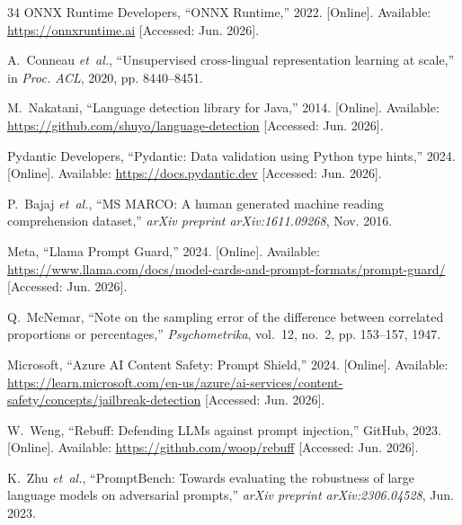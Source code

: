 ﻿\documentclass[conference]{IEEEtran}
\begin{document}
\begin{thebibliography}{34}
ONNX Runtime Developers, ``ONNX Runtime,'' 2022.
[Online]. Available: \url{https://onnxruntime.ai} [Accessed: Jun. 2026].

A.~Conneau \emph{et~al.}, ``Unsupervised cross-lingual representation
learning at scale,'' in \emph{Proc. ACL}, 2020, pp. 8440--8451.

M.~Nakatani, ``Language detection library for Java,'' 2014.
[Online]. Available: \url{https://github.com/shuyo/language-detection}
[Accessed: Jun. 2026].

Pydantic Developers, ``Pydantic: Data validation using Python type hints,''
2024.
[Online]. Available: \url{https://docs.pydantic.dev} [Accessed: Jun. 2026].

P.~Bajaj \emph{et~al.}, ``MS MARCO: A human generated machine reading
comprehension dataset,'' \emph{arXiv preprint arXiv:1611.09268}, Nov. 2016.

Meta, ``Llama Prompt Guard,'' 2024.
[Online]. Available:
\url{https://www.llama.com/docs/model-cards-and-prompt-formats/prompt-guard/}
[Accessed: Jun. 2026].

Q.~McNemar, ``Note on the sampling error of the difference between
correlated proportions or percentages,'' \emph{Psychometrika}, vol.~12,
no.~2, pp. 153--157, 1947.

Microsoft, ``Azure AI Content Safety: Prompt Shield,'' 2024.
[Online]. Available:
\url{https://learn.microsoft.com/en-us/azure/ai-services/content-safety/concepts/jailbreak-detection}
[Accessed: Jun. 2026].

W.~Weng, ``Rebuff: Defending LLMs against prompt injection,'' GitHub, 2023.
[Online]. Available: \url{https://github.com/woop/rebuff}
[Accessed: Jun. 2026].

K.~Zhu \emph{et~al.}, ``PromptBench: Towards evaluating the robustness of
large language models on adversarial prompts,''
\emph{arXiv preprint arXiv:2306.04528}, Jun. 2023.

\end{thebibliography}
\end{document}
